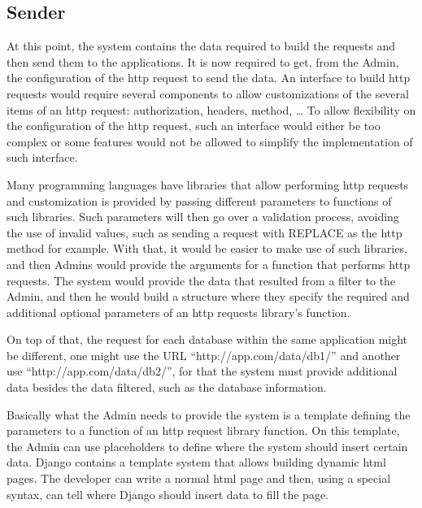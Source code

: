 \subsection{Sender}

At this point, the system contains the data required to build the requests and then send them to the applications.
It is now required to get, from the Admin, the configuration of the \gls{http} request to send the data.
An interface to build \gls{http} requests would require several components to allow customizations of the several items of an \gls{http} request: authorization, headers, method, \ldots
To allow flexibility on the configuration of the \gls{http} request, such an interface would either be too complex or some features would not be allowed to simplify the implementation of such interface.

Many programming languages have libraries that allow performing \gls{http} requests and customization is provided by passing different parameters to functions of such libraries.
Such parameters will then go over a validation process, avoiding the use of invalid values, such as sending a request with REPLACE as the \gls{http} method for example.
With that, it would be easier to make use of such libraries, and then Admins would provide the arguments for a function that performs \gls{http} requests.
The system would provide the data that resulted from a filter to the Admin, and then he would build a structure where they specify the required and additional optional parameters of an \gls{http} requests library's function.

On top of that, the request for each database within the same application might be different, one might use the URL ``http://app.com/data/db1/'' and another use ``http://app.com/data/db2/'', for that the system must provide additional data besides the data filtered, such as the database information.

Basically what the Admin needs to provide the system is a template defining the parameters to a function of an \gls{http} request library function.
On this template, the Admin can use placeholders to define where the system should insert certain data.
Django contains a template system that allows building dynamic \gls{html} pages.
The developer can write a normal \gls{html} page and then, using a special syntax, can tell where Django should insert data to fill the page.

